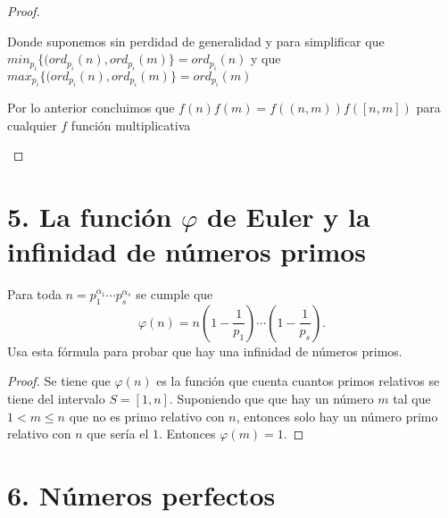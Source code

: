 \documentclass[12pt]{article}
\begin{document}
\begin{enumerate}
\begin{proof}
\begin{itemize}
                Donde suponemos sin perdidad de generalidad y para simplificar que $min_{p_i}\{(ord_{p_i}(n), ord_{p_i}(m)\} = ord_{p_i}(n) $ y que
                $max_{p_i}\{(ord_{p_i}(n), ord_{p_i}(m)\} = ord_{p_i}(m) $
                
                Por lo anterior concluimos que $f(n)f(m) = f((n,m))f([n,m])$ para cualquier $f$ función multiplicativa
                
            \end{itemize}
            
            
            
            \end{proof}
            
            
    \end{enumerate}













\section*{5. La función $\varphi$ de Euler y la infinidad de números primos}
Para toda $n=p_1^{\alpha_1}\cdots p_s^{\alpha_s}$ se cumple que
    \[
    \varphi(n)=n\left(1-\frac{1}{p_1}\right)\cdots \left(1-\frac{1}{p_s}\right).
    \]
Usa esta f\'ormula para probar que hay una infinidad de n\'umeros primos.
\begin{proof}
Se tiene que $\varphi(n)$ es la función que cuenta cuantos primos relativos se tiene
del intervalo $S=[1,n]$. Suponiendo que que hay un número $m$ tal que 
$1 < m \leq n$ que no es primo relativo con $n$, entonces solo hay un número primo
relativo con $n$ que sería el $1$. Entonces $\varphi(m)= 1$.
\end{proof}





\section*{6. Números perfectos}
\end{document}
